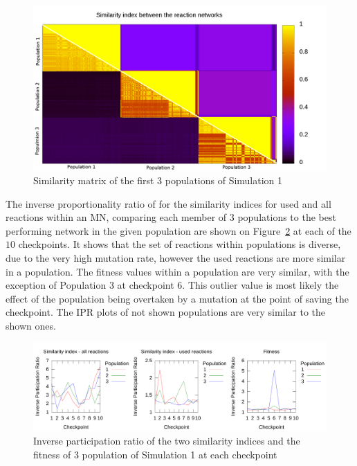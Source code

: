 \documentclass[a4paper,12pt]{article}
\begin{document}
\begin{figure}[htpb]
	\centering
	\includegraphics[width=1\linewidth]{simmatrix_firstjob.png}
	\caption{Similarity matrix of the first 3 populations of Simulation 1}
	\label{fig:simmatrix_firstjob}
\end{figure}

The inverse proportionality ratio of for the similarity indices for used and all reactions within an MN, comparing each member of $3$ populations to the best performing network in the given population are shown on Figure~\ref{fig:IPRsim1} at each of the $10$ checkpoints. It shows that the set of reactions within populations is diverse, due to the very high mutation rate, however the used reactions are more similar in a population. The fitness values within a population are very similar, with the exception of Population $3$ at checkpoint $6$. This outlier value is most likely the effect of the population being overtaken by a mutation at the point of saving the checkpoint. The IPR plots of not shown populations are very similar to the shown ones. 

\begin{figure}[htpb]
	\centering
	\includegraphics[width=1\linewidth]{IPR_sim1.pdf}
	\caption{Inverse participation ratio of the two similarity indices and the fitness of $3$ population of Simulation 1 at each checkpoint}
	\label{fig:IPRsim1}
\end{figure}
\end{document}
